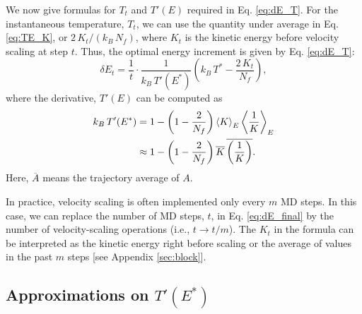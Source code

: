 \documentclass[reprint]{revtex4-1}
\begin{document}
We now give formulas for $T_t$
and $T'(E)$ required in Eq. \eqref{eq:dE_T}.
%
%
For the instantaneous temperature, $T_t$,
we can use the quantity under average in Eq. \eqref{eq:TE_K},
or $2 \, K_t/(k_B \, N_f)$,
where
$K_t$ is the kinetic energy before velocity scaling at step $t$.
%
Thus, the optimal energy increment is given by
Eq. \eqref{eq:dE_T}:
%
\begin{equation}
\delta E_t
=
\frac{ 1 } { t } \cdot
\frac{ 1 } { k_B \, T'(E^*) }
\left(
 k_B \, T^*
 -
 \frac{ 2 \, K_t } { N_f }
\right)
,
\label{eq:dE_final}
\end{equation}
%
where the derivative, $T'(E)$
can be computed as\cite{cagin1988}
%
\begin{align}
  k_B \, T'(E^*)
  &=
  1
  -
  \left(
    1 - \frac{2}{N_f}
  \right)
  \left\langle
  K
  \right\rangle_E
  \left\langle
    \frac 1 K
  \right\rangle_E
  \notag
  \\
  &\approx
  1
  -
  \left(
    1 - \frac{ 2 } { N_f }
  \right)
  \overline{ K }
  \,
  \overline{ \left( \frac 1 K \right) }
  .
  \label{eq:dT}
\end{align}
%
Here,
$\overline A$ means the trajectory average of $A$.

In practice, velocity scaling is often implemented
only every $m$ MD steps.
%
In this case,
we can replace the number of MD steps, $t$,
in Eq. \eqref{eq:dE_final} by
the number of velocity-scaling operations
(i.e., $t \to t/m$).
%
The $K_t$ in the formula can be interpreted as
the kinetic energy right before scaling
or the average of values in the past $m$ steps
[see Appendix \ref{sec:block}].




\subsection{\label{sec:gamma}
Approximations on $T'(E^*)$}
\end{document}
